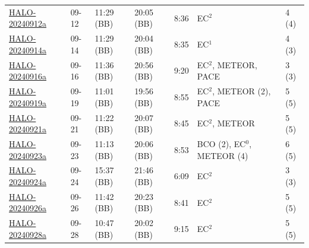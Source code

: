 \begin{table}
\begin{tabular}{lllllll}
\href{https://orcestra-campaign.org/reports/HALO-20240912a.html}{HALO-20240912a} & 09-12 & 11:29 (BB) & 20:05 (BB) & 8:36 & EC$^{2}$ & 4 (4) \\
\href{https://orcestra-campaign.org/reports/HALO-20240914a.html}{HALO-20240914a} & 09-14 & 11:29 (BB) & 20:04 (BB) & 8:35 & EC$^{1}$ & 4 (3) \\
\href{https://orcestra-campaign.org/reports/HALO-20240916a.html}{HALO-20240916a} & 09-16 & 11:36 (BB) & 20:56 (BB) & 9:20 & EC$^{2}$, METEOR, PACE & 3 (3) \\
\href{https://orcestra-campaign.org/reports/HALO-20240919a.html}{HALO-20240919a} & 09-19 & 11:01 (BB) & 19:56 (BB) & 8:55 & EC$^{2}$, METEOR (2), PACE & 5 (5) \\
\href{https://orcestra-campaign.org/reports/HALO-20240921a.html}{HALO-20240921a} & 09-21 & 11:22 (BB) & 20:07 (BB) & 8:45 & EC$^{2}$, METEOR & 5 (5) \\
\href{https://orcestra-campaign.org/reports/HALO-20240923a.html}{HALO-20240923a} & 09-23 & 11:13 (BB) & 20:06 (BB) & 8:53 & BCO (2), EC$^{0}$, METEOR (4) & 6 (5) \\
\href{https://orcestra-campaign.org/reports/HALO-20240924a.html}{HALO-20240924a} & 09-24 & 15:37 (BB) & 21:46 (BB) & 6:09 & EC$^{2}$ & 3 (3) \\
\href{https://orcestra-campaign.org/reports/HALO-20240926a.html}{HALO-20240926a} & 09-26 & 11:42 (BB) & 20:23 (BB) & 8:41 & EC$^{2}$ & 5 (5) \\
\href{https://orcestra-campaign.org/reports/HALO-20240928a.html}{HALO-20240928a} & 09-28 & 10:47 (BB) & 20:02 (BB) & 9:15 & EC$^{2}$ & 5 (5) \\

\end{tabular}
\end{table}
